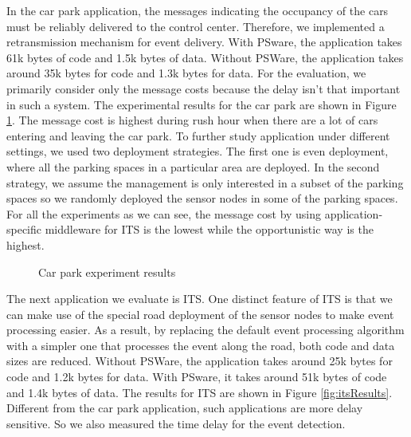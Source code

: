 In the car park application, the messages indicating the occupancy of the cars must be reliably delivered to the control center. Therefore, we implemented a retransmission mechanism for event delivery. With PSware, the application takes 61k bytes of code and 1.5k bytes of data. Without PSWare, the application takes around 35k bytes for code and 1.3k bytes for data. For the evaluation, we primarily consider only the message costs because the delay isn't that important in such a system. The experimental results for the car park are shown in Figure \ref{fig:carParkResults}. The message cost is highest during rush hour when there are a lot of cars entering and leaving the car park. To further study application under different settings, we used two deployment strategies. The first one is even deployment, where all the parking spaces in a particular area are deployed. In the second strategy, we assume the management is only interested in a subset of the parking spaces so we randomly deployed the sensor nodes in some of the parking spaces. For all the experiments as we can see, the message cost by using application-specific middleware for ITS is the lowest while the opportunistic way is the highest.

\begin{figure}
\centering
{}
{}
\caption{Car park experiment results}
\label{fig:carParkResults}
\end{figure}

The next application we evaluate is ITS. One distinct feature of ITS is that we can make use of the special road deployment of the sensor nodes to make event processing easier. As a result, by replacing the default event processing algorithm with a simpler one that processes the event along the road, both code and data sizes are reduced. Without PSWare, the application takes around 25k bytes for code and 1.2k bytes for data. With PSware, it takes around 51k bytes of code and 1.4k bytes of data. The results for ITS are shown in Figure \ref{fig:itsResults}. Different from the car park application, such applications are more delay sensitive. So we also measured the time delay for the event detection. %
 
